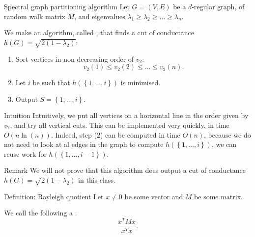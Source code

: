 \documentclass[a4paper]{article}
\begin{document}
\begin{parag}{Spectral graph partitioning algorithm}
    Let $G = \left(V, E\right)$ be a $d$-regular graph, of random walk matrix $M$, and eigenvalues $\lambda_1 \geq \lambda_2 \geq \ldots \geq \lambda_n$.

    We make an algorithm, called , that finds a cut of conductance $h\left(G\right) = \sqrt{2\left(1 - \lambda_2\right)}$:
    \begin{enumerate}
        \item Sort vertices in non decreasing order of $v_2$: 
        \[v_2\left(1\right) \leq v_2\left(2\right) \leq \ldots \leq v_2\left(n\right).\]
        \item Let $i$ be such that $h\left(\left\{1, \ldots, i\right\}\right)$ is minimised.
        \item Output $S = \left\{1, \ldots, i\right\}$.
    \end{enumerate}

    \begin{subparag}{Intuition}
        Intuitively, we put all vertices on a horizontal line in the order given by $v_2$, and try all vertical cuts. This can be implemented very quickly, in time $O\left(n \ln\left(n\right)\right)$. Indeed, step (2) can be computed in time $O\left(n\right)$, because we do not need to look at al edges in the graph to compute $h\left(\left\{1, \ldots, i\right\}\right)$, we can reuse work for $h\left(\left\{1, \ldots, i-1\right\}\right)$.
    \end{subparag}

    \begin{subparag}{Remark}
        We will not prove that this algorithm does output a cut of conductance $h\left(G\right) = \sqrt{2\left(1 - \lambda_2\right)}$ in this class.
    \end{subparag}
\end{parag}

\begin{parag}{Definition: Rayleigh quotient}
    Let $x \neq 0$ be some vector and $M$ be some matrix.

    We call the following a : 
    \[\frac{x^T M x}{x^T x}.\]
\end{parag}
\end{document}
